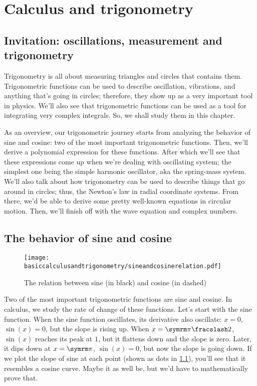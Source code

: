 \chapter{Calculus and trigonometry}


\section{Invitation: oscillations, measurement and trigonometry}

Trigonometry is all about measuring triangles and circles that contains them. Trigonometric functions can be used to describe oscillation, vibrations, and anything that's going in circles; therefore, they show up as a very important tool in physics. We'll also see that trigonometric functions can be used as a tool for integrating very complex integrals. So, we shall study them in this chapter.

As an overview, our trigonometric journey starts from analyzing the behavior of sine and cosine: two of the most important trigonometric functions. Then, we'll derive a polynomial expression for these functions. After which we'll see that these expressions come up when we're dealing with oscillating system; the simplest one being the simple harmonic oscillator, aka the spring-mass system. We'll also talk about how trigonometry can be used to describe things that go around in circles; thus, the Newton's law in radial coordinate systems. From there, we'd be able to derive some pretty well-known equations in circular motion. Then, we'll finish off with the wave equation and complex numbers.

\section{The behavior of sine and cosine}

\begin{figure}[ht]
    \centering
    \texttt{[image: basiccalculusandtrigonometry/sineandcosinerelation.pdf]}
    \caption{The relation between sine (in black) and cosine (in dashed)}
    \label{fig:sine_cosine_relation}
\end{figure}

Two of the most important trigonometric functions are sine and cosine. In calculus, we study the rate of change of these functions. Let's start with the sine function. When the sine function oscillates, its derivative also oscillate: $x = 0$, $\sin(x) = 0$, but the slope is rising up. When $x = \flatfrac{\cpi}{2}$, $\sin(x)$ reaches its peak at $1$, but it flattens down and the slope is zero. Later, it dips down at $x = \cpi$, $\sin(x) = 0$, but now the slope is going down. If we plot the slope of sine at each point (shown as dots in \cref{fig:sine_cosine_relation}), you'll see that it resembles a cosine curve. Maybe it as well be, but we'd have to mathematically prove that.

